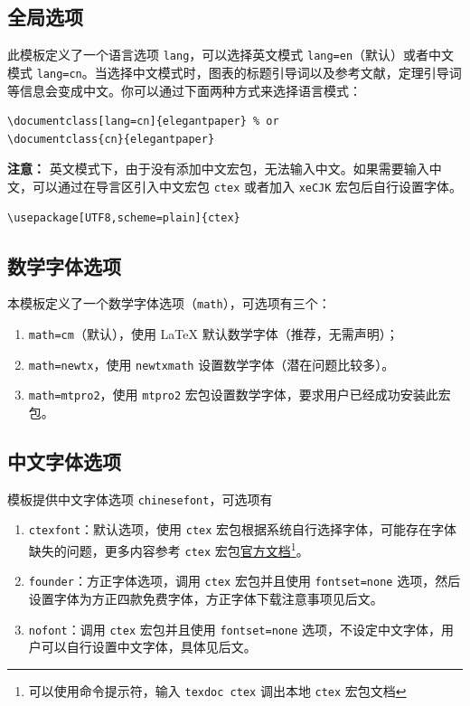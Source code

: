 \documentclass[lang=cn,11pt,a4paper,cite=authoryear]{elegantpaper}
\begin{document}
\subsection{全局选项}
此模板定义了一个语言选项 \lstinline{lang}，可以选择英文模式 \lstinline{lang=en}（默认）或者中文模式 \lstinline{lang=cn}。当选择中文模式时，图表的标题引导词以及参考文献，定理引导词等信息会变成中文。你可以通过下面两种方式来选择语言模式：
\begin{lstlisting}
\documentclass[lang=cn]{elegantpaper} % or
\documentclass{cn}{elegantpaper} 
\end{lstlisting}

\textbf{注意：} 英文模式下，由于没有添加中文宏包，无法输入中文。如果需要输入中文，可以通过在导言区引入中文宏包 \lstinline{ctex} 或者加入 \lstinline{xeCJK} 宏包后自行设置字体。 
\begin{lstlisting}
\usepackage[UTF8,scheme=plain]{ctex}
\end{lstlisting}

\subsection{数学字体选项}

本模板定义了一个数学字体选项（\lstinline{math}），可选项有三个：
\begin{enumerate}
  \item \lstinline{math=cm}（默认），使用 \LaTeX{} 默认数学字体（推荐，无需声明）；
  \item \lstinline{math=newtx}，使用 \lstinline{newtxmath} 设置数学字体（潜在问题比较多）。
  \item \lstinline{math=mtpro2}，使用 \lstinline{mtpro2} 宏包设置数学字体，要求用户已经成功安装此宏包。
\end{enumerate}

\subsection{中文字体选项}
模板提供中文字体选项 \lstinline{chinesefont}，可选项有
\begin{enumerate}
\item \lstinline{ctexfont}：默认选项，使用 \lstinline{ctex} 宏包根据系统自行选择字体，可能存在字体缺失的问题，更多内容参考 \lstinline{ctex} 宏包\href{https://ctan.org/pkg/ctex}{官方文档}\footnote{可以使用命令提示符，输入 \lstinline{texdoc ctex} 调出本地 \lstinline{ctex} 宏包文档}。
\item \lstinline{founder}：方正字体选项，调用 \lstinline{ctex} 宏包并且使用 \lstinline{fontset=none} 选项，然后设置字体为方正四款免费字体，方正字体下载注意事项见后文。
\item \lstinline{nofont}：调用 \lstinline{ctex} 宏包并且使用 \lstinline{fontset=none} 选项，不设定中文字体，用户可以自行设置中文字体，具体见后文。
\end{enumerate}
\end{document}
